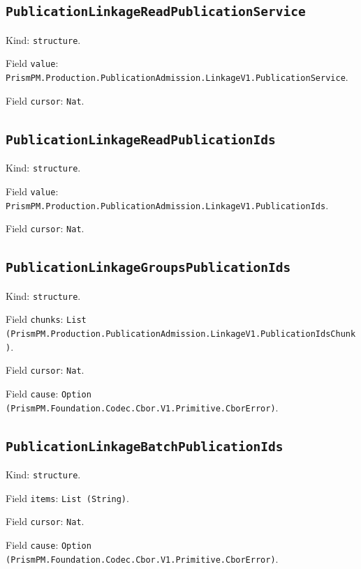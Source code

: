 \documentclass[11pt]{article}
\begin{document}
\subsection*{\texttt{PublicationLinkageReadPublicationService}}
\noindent Kind: \texttt{structure}.\par
\noindent Field \texttt{value}: \texttt{PrismPM.Production.PublicationAdmission.LinkageV1.PublicationService}.\par
\noindent Field \texttt{cursor}: \texttt{Nat}.\par
\subsection*{\texttt{PublicationLinkageReadPublicationIds}}
\noindent Kind: \texttt{structure}.\par
\noindent Field \texttt{value}: \texttt{PrismPM.Production.PublicationAdmission.LinkageV1.PublicationIds}.\par
\noindent Field \texttt{cursor}: \texttt{Nat}.\par
\subsection*{\texttt{PublicationLinkageGroupsPublicationIds}}
\noindent Kind: \texttt{structure}.\par
\noindent Field \texttt{chunks}: \texttt{List (PrismPM.Production.PublicationAdmission.LinkageV1.PublicationIdsChunk)}.\par
\noindent Field \texttt{cursor}: \texttt{Nat}.\par
\noindent Field \texttt{cause}: \texttt{Option (PrismPM.Foundation.Codec.Cbor.V1.Primitive.CborError)}.\par
\subsection*{\texttt{PublicationLinkageBatchPublicationIds}}
\noindent Kind: \texttt{structure}.\par
\noindent Field \texttt{items}: \texttt{List (String)}.\par
\noindent Field \texttt{cursor}: \texttt{Nat}.\par
\noindent Field \texttt{cause}: \texttt{Option (PrismPM.Foundation.Codec.Cbor.V1.Primitive.CborError)}.\par
\end{document}
